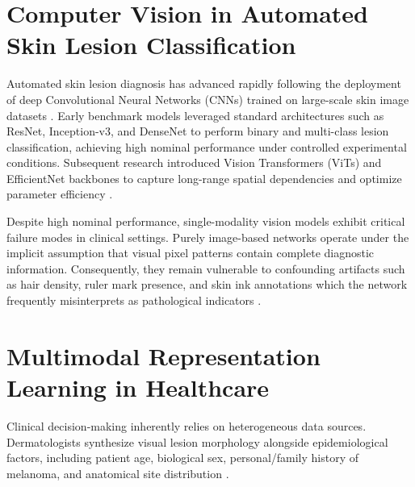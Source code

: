 \documentclass[12pt,a4paper]{report}
\begin{document}
	\section{Computer Vision in Automated Skin Lesion Classification}
	Automated skin lesion diagnosis has advanced rapidly following the deployment of deep Convolutional Neural Networks (CNNs) trained on large-scale skin image datasets \cite{esteva2017dermatologist, tschandl2018ham10000}. Early benchmark models leveraged standard architectures such as ResNet, Inception-v3, and DenseNet to perform binary and multi-class lesion classification, achieving high nominal performance under controlled experimental conditions. Subsequent research introduced Vision Transformers (ViTs) and EfficientNet backbones to capture long-range spatial dependencies and optimize parameter efficiency \cite{tan2019efficientnet}.
	
	Despite high nominal performance, single-modality vision models exhibit critical failure modes in clinical settings. Purely image-based networks operate under the implicit assumption that visual pixel patterns contain complete diagnostic information. Consequently, they remain vulnerable to confounding artifacts such as hair density, ruler mark presence, and skin ink annotations which the network frequently misinterprets as pathological indicators \cite{bisla2019towards}.
	
	\section{Multimodal Representation Learning in Healthcare}
	Clinical decision-making inherently relies on heterogeneous data sources. Dermatologists synthesize visual lesion morphology alongside epidemiological factors, including patient age, biological sex, personal/family history of melanoma, and anatomical site distribution \cite{huang2020multimodal}. 
	
\end{document}
